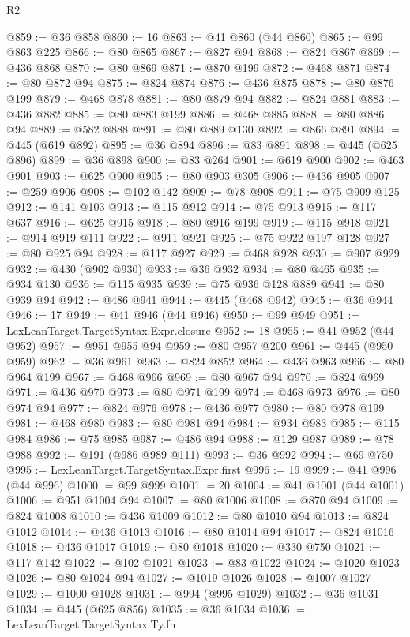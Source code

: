 \begin{lexlean}{R2}
\begin{coremodule}
@859 := @36 @858
@860 := 16
@863 := @41 @860 (@44 @860)
@865 := @99 @863 @225
@866 := @80 @865
@867 := @827 @94
@868 := @824 @867
@869 := @436 @868
@870 := @80 @869
@871 := @870 @199
@872 := @468 @871
@874 := @80 @872 @94
@875 := @824 @874
@876 := @436 @875
@878 := @80 @876 @199
@879 := @468 @878
@881 := @80 @879 @94
@882 := @824 @881
@883 := @436 @882
@885 := @80 @883 @199
@886 := @468 @885
@888 := @80 @886 @94
@889 := @582 @888
@891 := @80 @889 @130
@892 := @866 @891
@894 := @445 (@619 @892)
@895 := @36 @894
@896 := @83 @891
@898 := @445 (@625 @896)
@899 := @36 @898
@900 := @83 @264
@901 := @619 @900
@902 := @463 @901
@903 := @625 @900
@905 := @80 @903 @305
@906 := @436 @905
@907 := @259 @906
@908 := @102 @142
@909 := @78 @908
@911 := @75 @909 @125
@912 := @141 @103
@913 := @115 @912
@914 := @75 @913
@915 := @117 @637
@916 := @625 @915
@918 := @80 @916 @199
@919 := @115 @918
@921 := @914 @919 @111
@922 := @911 @921
@925 := @75 @922 @197 @128
@927 := @80 @925 @94
@928 := @117 @927
@929 := @468 @928
@930 := @907 @929
@932 := @430 (@902 @930)
@933 := @36 @932
@934 := @80 @465
@935 := @934 @130
@936 := @115 @935
@939 := @75 @936 @128 @889
@941 := @80 @939 @94
@942 := @486 @941
@944 := @445 (@468 @942)
@945 := @36 @944
@946 := 17
@949 := @41 @946 (@44 @946)
@950 := @99 @949
@951 := LexLeanTarget.TargetSyntax.Expr.closure
@952 := 18
@955 := @41 @952 (@44 @952)
@957 := @951 @955 @94
@959 := @80 @957 @200
@961 := @445 (@950 @959)
@962 := @36 @961
@963 := @824 @852
@964 := @436 @963
@966 := @80 @964 @199
@967 := @468 @966
@969 := @80 @967 @94
@970 := @824 @969
@971 := @436 @970
@973 := @80 @971 @199
@974 := @468 @973
@976 := @80 @974 @94
@977 := @824 @976
@978 := @436 @977
@980 := @80 @978 @199
@981 := @468 @980
@983 := @80 @981 @94
@984 := @934 @983
@985 := @115 @984
@986 := @75 @985
@987 := @486 @94
@988 := @129 @987
@989 := @78 @988
@992 := @191 (@986 @989 @111)
@993 := @36 @992
@994 := @69 @750
@995 := LexLeanTarget.TargetSyntax.Expr.first
@996 := 19
@999 := @41 @996 (@44 @996)
@1000 := @99 @999
@1001 := 20
@1004 := @41 @1001 (@44 @1001)
@1006 := @951 @1004 @94
@1007 := @80 @1006
@1008 := @870 @94
@1009 := @824 @1008
@1010 := @436 @1009
@1012 := @80 @1010 @94
@1013 := @824 @1012
@1014 := @436 @1013
@1016 := @80 @1014 @94
@1017 := @824 @1016
@1018 := @436 @1017
@1019 := @80 @1018
@1020 := @330 @750
@1021 := @117 @142
@1022 := @102 @1021
@1023 := @83 @1022
@1024 := @1020 @1023
@1026 := @80 @1024 @94
@1027 := @1019 @1026
@1028 := @1007 @1027
@1029 := @1000 @1028
@1031 := @994 (@995 @1029)
@1032 := @36 @1031
@1034 := @445 (@625 @856)
@1035 := @36 @1034
@1036 := LexLeanTarget.TargetSyntax.Ty.fn

\end{coremodule}
\end{lexlean}
